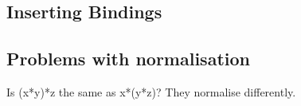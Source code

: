 \subsection{Inserting Bindings}


\subsection{Problems with normalisation}

Is (x*y)*z the same as x*(y*z)?  They normalise differently. 

